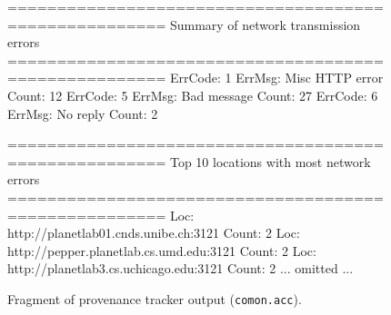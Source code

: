  



\begin{figure}[t]
\centering
\begin{scodebox}
======================================================
Summary of network transmission errors
======================================================
ErrCode: 1      ErrMsg: Misc HTTP error Count: 12
ErrCode: 5      ErrMsg: Bad message     Count: 27
ErrCode: 6      ErrMsg: No reply        Count: 2

======================================================
Top 10 locations with most network errors
======================================================
Loc: http://planetlab01.cnds.unibe.ch:3121    Count: 2
Loc: http://pepper.planetlab.cs.umd.edu:3121  Count: 2
Loc: http://planetlab3.cs.uchicago.edu:3121   Count: 2
... omitted ...
\end{scodebox}
\caption{Fragment of provenance tracker output (\texttt{comon.acc}).} \label{fig:acc}
\end{figure} 




